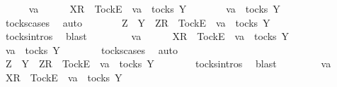 \ \ \ \ \isamarkupfalse%
\ va\isanewline
\ \ \ \ \isamarkupfalse%
\ {\isachardoublequoteopen}{\isacharbrackleft}X{\isacharbrackright}\isactrlsub R\ {\isacharhash}\ {\isacharbrackleft}Tock{\isacharbrackright}\isactrlsub E\ {\isacharhash}\ va\ {\isasymin}\ tocks\ Y{\isachardoublequoteclose}\isanewline
\ \ \ \ \isamarkupfalse%
\ \isamarkupfalse%
\ {\isachardoublequoteopen}va\ {\isasymin}\ tocks\ Y{\isachardoublequoteclose}\isanewline
\ \ \ \ \ \ \isamarkupfalse%
\ tocks{\isachardot}cases\ \isamarkupfalse%
\ auto\isanewline
\ \ \ \ \isamarkupfalse%
\ \isamarkupfalse%
\ {\isachardoublequoteopen}Z\ {\isasymsubseteq}\ Y\ {\isasymLongrightarrow}\ {\isacharbrackleft}Z{\isacharbrackright}\isactrlsub R\ {\isacharhash}\ {\isacharbrackleft}Tock{\isacharbrackright}\isactrlsub E\ {\isacharhash}\ va\ {\isasymin}\ tocks\ Y{\isachardoublequoteclose}\isanewline
\ \ \ \ \ \ \isamarkupfalse%
\ tocks{\isachardot}intros\ \isamarkupfalse%
\ blast\isanewline
\ \ \isamarkupfalse%
\isanewline
\ \ \ \ \isamarkupfalse%
\ va\isanewline
\ \ \ \ \isamarkupfalse%
\ {\isachardoublequoteopen}{\isacharbrackleft}X{\isacharbrackright}\isactrlsub R\ {\isacharhash}\ {\isacharbrackleft}Tock{\isacharbrackright}\isactrlsub E\ {\isacharhash}\ va\ {\isasymin}\ tocks\ Y{\isachardoublequoteclose}\isanewline
\ \ \ \ \isamarkupfalse%
\ \isamarkupfalse%
\ {\isachardoublequoteopen}va\ {\isasymin}\ tocks\ Y{\isachardoublequoteclose}\isanewline
\ \ \ \ \ \ \isamarkupfalse%
\ tocks{\isachardot}cases\ \isamarkupfalse%
\ auto\isanewline
\ \ \ \ \isamarkupfalse%
\ \isamarkupfalse%
\ {\isachardoublequoteopen}Z\ {\isasymsubseteq}\ Y\ {\isasymLongrightarrow}\ {\isacharbrackleft}Z{\isacharbrackright}\isactrlsub R\ {\isacharhash}\ {\isacharbrackleft}Tock{\isacharbrackright}\isactrlsub E\ {\isacharhash}\ va\ {\isasymin}\ tocks\ Y{\isachardoublequoteclose}\isanewline
\ \ \ \ \ \ \isamarkupfalse%
\ tocks{\isachardot}intros\ \isamarkupfalse%
\ blast\isanewline
\ \ \isamarkupfalse%
\isanewline
\ \ \ \ \isamarkupfalse%
\ va\isanewline
\ \ \ \ \isamarkupfalse%
\ {\isachardoublequoteopen}{\isacharbrackleft}X{\isacharbrackright}\isactrlsub R\ {\isacharhash}\ {\isacharbrackleft}Tock{\isacharbrackright}\isactrlsub E\ {\isacharhash}\ va\ {\isasymin}\ tocks\ Y{\isachardoublequoteclose}\isanewline
